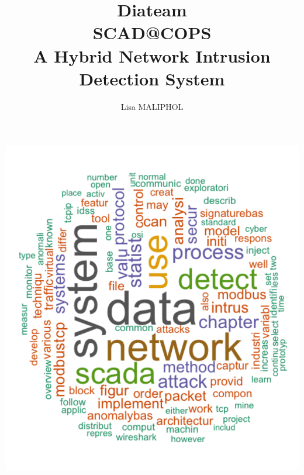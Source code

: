 \documentclass[12pt,]{article}
\title{Diateam\\SCAD@COPS\\A Hybrid Network Intrusion Detection System}
\author{Lisa MALIPHOL}
\date{}
\begin{document}
\maketitle


\includegraphics{thesis_files/figure-latex/unnamed-chunk-3-1.pdf}

\thispagestyle{empty} \clearpage
\end{document}
